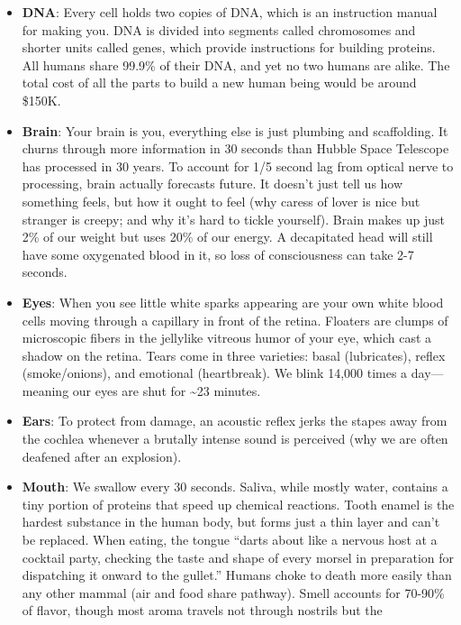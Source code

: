\documentclass[
]{article}
\begin{document}
\begin{itemize}
\item
  \textbf{DNA}: Every cell holds two copies of DNA, which is an
  instruction manual for making you. DNA is divided into segments called
  chromosomes and shorter units called genes, which provide instructions
  for building proteins. All humans share 99.9\% of their DNA, and yet
  no two humans are alike. The total cost of all the parts to build a
  new human being would be around \$150K.
\item
  \textbf{Brain}: Your brain is you, everything else is just plumbing
  and scaffolding. It churns through more information in 30 seconds than
  Hubble Space Telescope has processed in 30 years. To account for 1/5
  second lag from optical nerve to processing, brain actually forecasts
  future. It doesn't just tell us how something feels, but how it ought
  to feel (why caress of lover is nice but stranger is creepy; and why
  it's hard to tickle yourself). Brain makes up just 2\% of our weight
  but uses 20\% of our energy. A decapitated head will still have some
  oxygenated blood in it, so loss of consciousness can take 2-7 seconds.
\item
  \textbf{Eyes}: When you see little white sparks appearing are your own
  white blood cells moving through a capillary in front of the retina.
  Floaters are clumps of microscopic fibers in the jellylike vitreous
  humor of your eye, which cast a shadow on the retina. Tears come in
  three varieties: basal (lubricates), reflex (smoke/onions), and
  emotional (heartbreak). We blink 14,000 times a day---meaning our eyes
  are shut for \textasciitilde23 minutes.
\item
  \textbf{Ears}: To protect from damage, an acoustic reflex jerks the
  stapes away from the cochlea whenever a brutally intense sound is
  perceived (why we are often deafened after an explosion).
\item
  \textbf{Mouth}: We swallow every 30 seconds. Saliva, while mostly
  water, contains a tiny portion of proteins that speed up chemical
  reactions. Tooth enamel is the hardest substance in the human body,
  but forms just a thin layer and can't be replaced. When eating, the
  tongue ``darts about like a nervous host at a cocktail party, checking
  the taste and shape of every morsel in preparation for dispatching it
  onward to the gullet.'' Humans choke to death more easily than any
  other mammal (air and food share pathway). Smell accounts for 70-90\%
  of flavor, though most aroma travels not through nostrils but the

\end{itemize}
\end{document}

